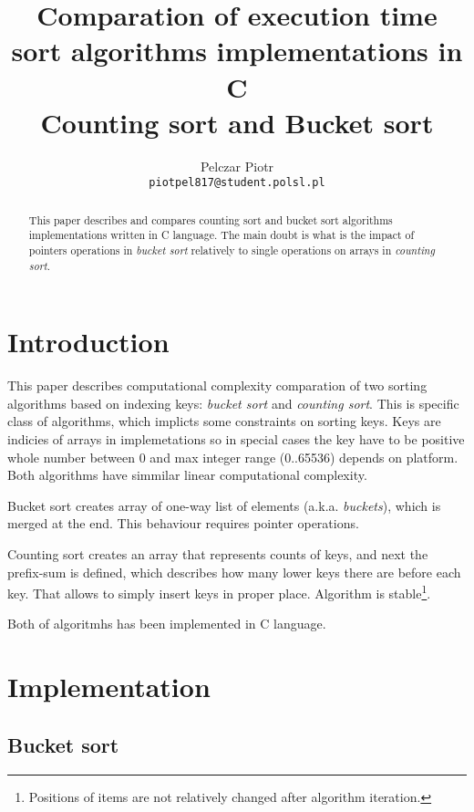\documentclass[12pt]{article}
\title{Comparation of execution time sort algorithms implementations in C\\
Counting sort and Bucket sort}
\author{
	  Pelczar Piotr\\
	  \small{\texttt{piotpel817@student.polsl.pl}}
	}
\date{\displaydate{date}}
\begin{document}
\maketitle
 
\begin{abstract}
This paper describes and compares counting sort and bucket sort algorithms implementations written in C language.
The main doubt is what is the impact of pointers operations in \emph{bucket sort} relatively to single operations on arrays
in \emph{counting sort}.
\end{abstract}

\renewcommand{\contentsname}{Contents}

\newpage
\tableofcontents

\newpage
\section{Introduction}
\label{sec:intro}

This paper describes computational complexity comparation of two sorting algorithms based on indexing keys: \emph{bucket sort} and \emph{counting sort}. This is specific class of algorithms, which implicts some constraints on sorting keys. Keys are indicies of arrays in implemetations so in special cases the key have to be positive whole number between 0 and max integer range (0..65536) depends on platform. Both algorithms have simmilar linear computational complexity.

Bucket sort creates array of one-way list of elements (a.k.a. \emph{buckets}), which is merged at the end. This behaviour requires pointer operations\cite{cormen}.

Counting sort creates an array that represents counts of keys, and next the prefix-sum is defined, which describes how many lower keys there are before each key\cite{cormen}. That allows to simply insert keys in proper place. Algorithm is stable\footnote{Positions of items are not relatively changed after algorithm iteration.}.

Both of algoritmhs has been implemented in C language.

\section{Implementation}
\subsection{Bucket sort}
\end{document}
